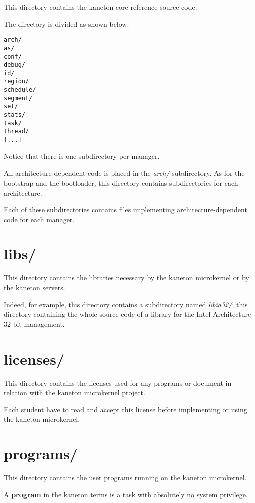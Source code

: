 This directory contains the kaneton core reference source code.

The directory is divided as shown below:

\begin{verbatim}
arch/
as/
conf/
debug/
id/
region/
schedule/
segment/
set/
stats/
task/
thread/
[...]
\end{verbatim}

Notice that there is one subdirectory per manager.

All architecture dependent code is placed in the \textit{arch/} subdirectory.
As for the bootstrap and the bootloader, this directory contains
subdirectories for each architecture.

Each of these subdirectories contains files implementing
architecture-dependent code for each manager.

%
%

\section{libs/}

This directory contains the libraries necessary by the kaneton microkernel
or by the kaneton servers.

Indeed, for example, this directory contains a subdirectory named
\textit{libia32/}; this directory containing the whole source code of
a library for the Intel Architecture 32-bit management.

%
%

\section{licenses/}

This directory contains the licenses used for any programs or document
in relation with the kaneton microkernel project.

Each student have to read and accept this license before implementing
or using the kaneton microkernel.

%
%

\section{programs/}

This directory contains the user programs running on the kaneton
microkernel.

A \textbf{program} in the kaneton terms is a task with absolutely no
system privilege.

